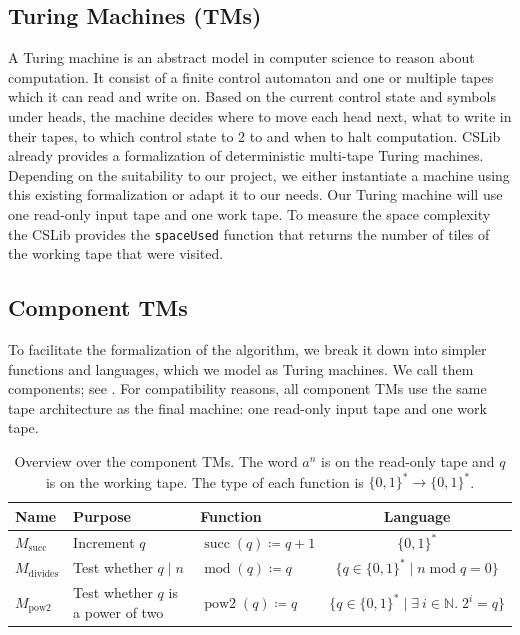 \documentclass[UTF8]{article}
\newcommand{\set}[1]{\{#1\}}
\begin{document}
\subsection{Turing Machines (TMs)}

A Turing machine is an abstract model in computer science to reason about computation. 
It consist of a finite control automaton and one or multiple tapes which it can read and write on.
Based on the current control state and symbols under heads, the machine decides where to move each head next, what to write in their tapes, to which control state to 2 to and when to halt computation.
CSLib already provides a formalization of deterministic multi-tape Turing machines. 
Depending on the suitability to our project, we either instantiate a machine using this existing formalization or adapt it to our needs. 
Our Turing machine will use one read-only input tape and one work tape. 
To measure the space complexity the CSLib provides the \texttt{spaceUsed} function that returns the number of tiles of the working tape that were visited. 


\subsection{Component TMs}
To facilitate the formalization of the algorithm, we break it down into simpler functions and languages, which we model as Turing machines.
We call them components; see . 
For compatibility reasons, all component TMs use the same tape architecture as the final machine: one read-only input tape and one work tape.


\begin{table}[h]
    \centering
    \begin{tabular}{l|l|l|c}
        Name  & Purpose & Function & Language \\
        \hline
        $M_{\operatorname{succ}}$ & Increment $q$ & ${\operatorname{succ}}(q)\coloneqq q+1$ & $\set{0,1}^*$ \\

        $M_{\operatorname{divides}}$ &Test whether $q\mid n$ & ${\operatorname{mod}}(q)\coloneqq q$ & $\set{q \in \set{0,1}^* \mid n \operatorname{mod} q = 0}$ \\ 
           
        $M_{\operatorname{pow2}}$ &Test whether $q$ is a power of two &  ${\operatorname{pow2}}(q) \coloneq q$ & $\set{q \in \set{0,1}^* \mid \exists\ i \in \mathbb{N}.\; 2^i = q}$
        
    \end{tabular}
    \caption{Overview over the component TMs. The word $a^n$ is on the read-only tape and $q$ is on the working tape. The type of each function is $\set{0,1}^*\rightarrow \set{0,1}^*$.}
    \label{tab:compTMs}
\end{table}
\end{document}
